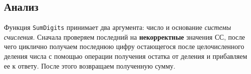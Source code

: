 \documentclass[12pt, a4paper]{article}
\begin{document}
\subsection{Анализ}
Функция \texttt{SumDigits} принимает два аргумента: число и основание 
\emph{системы счисления}. Сначала проверяем последний на 
\textbf{некорректные} значения СС, после чего циклично получаем последнюю
цифру остающегося после целочисленного деления числа с помощью операции
получения остатка от деления и прибавляем ее к ответу. После этого 
возвращаем полученную сумму.

\makeatletter
\renewcommand{\@biblabel}[1]{#1.}
\makeatother


\end{document}

